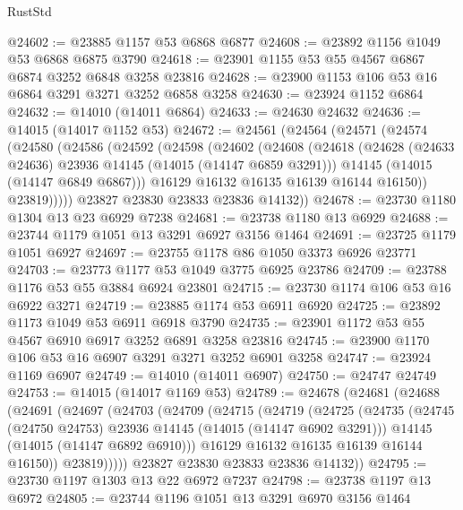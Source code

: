 \begin{lexlean}{RustStd}
\begin{coremodule}
@24602 := @23885 @1157 @53 @6868 @6877
@24608 := @23892 @1156 @1049 @53 @6868 @6875 @3790
@24618 := @23901 @1155 @53 @55 @4567 @6867 @6874 @3252 @6848 @3258 @23816
@24628 := @23900 @1153 @106 @53 @16 @6864 @3291 @3271 @3252 @6858 @3258
@24630 := @23924 @1152 @6864
@24632 := @14010 (@14011 @6864)
@24633 := @24630 @24632
@24636 := @14015 (@14017 @1152 @53)
@24672 := @24561
    (@24564
      (@24571
        (@24574
          (@24580
            (@24586
              (@24592
                (@24598
                  (@24602
                    (@24608
                      (@24618
                        (@24628 (@24633 @24636) @23936 @14145 (@14015 (@14147 @6859 @3291)))
                        @14145
                        (@14015 (@14147 @6849 @6867)))
                      @16129
                      @16132
                      @16135
                      @16139
                      @16144
                      @16150))
                  @23819)))))
        @23827
        @23830
        @23833
        @23836
        @14132))
@24678 := @23730 @1180 @1304 @13 @23 @6929 @7238
@24681 := @23738 @1180 @13 @6929
@24688 := @23744 @1179 @1051 @13 @3291 @6927 @3156 @1464
@24691 := @23725 @1179 @1051 @6927
@24697 := @23755 @1178 @86 @1050 @3373 @6926 @23771
@24703 := @23773 @1177 @53 @1049 @3775 @6925 @23786
@24709 := @23788 @1176 @53 @55 @3884 @6924 @23801
@24715 := @23730 @1174 @106 @53 @16 @6922 @3271
@24719 := @23885 @1174 @53 @6911 @6920
@24725 := @23892 @1173 @1049 @53 @6911 @6918 @3790
@24735 := @23901 @1172 @53 @55 @4567 @6910 @6917 @3252 @6891 @3258 @23816
@24745 := @23900 @1170 @106 @53 @16 @6907 @3291 @3271 @3252 @6901 @3258
@24747 := @23924 @1169 @6907
@24749 := @14010 (@14011 @6907)
@24750 := @24747 @24749
@24753 := @14015 (@14017 @1169 @53)
@24789 := @24678
    (@24681
      (@24688
        (@24691
          (@24697
            (@24703
              (@24709
                (@24715
                  (@24719
                    (@24725
                      (@24735
                        (@24745 (@24750 @24753) @23936 @14145 (@14015 (@14147 @6902 @3291)))
                        @14145
                        (@14015 (@14147 @6892 @6910)))
                      @16129
                      @16132
                      @16135
                      @16139
                      @16144
                      @16150))
                  @23819)))))
        @23827
        @23830
        @23833
        @23836
        @14132))
@24795 := @23730 @1197 @1303 @13 @22 @6972 @7237
@24798 := @23738 @1197 @13 @6972
@24805 := @23744 @1196 @1051 @13 @3291 @6970 @3156 @1464

\end{coremodule}
\end{lexlean}
